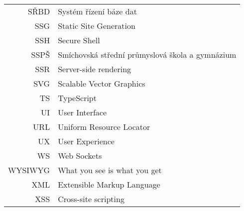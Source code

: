 \begin{longtable}{rl}
SŘBD & Systém řízení báze dat\\
SSG & Static Site Generation\\
SSH & Secure Shell\\
SSPŠ & Smíchovská střední průmyslová škola a gymnázium\\
SSR & Server-side rendering\\
SVG & Scalable Vector Graphics\\
TS & TypeScript\\
UI & User Interface\\
URL & Uniform Resource Locator\\
UX & User Experience\\
WS & Web Sockets\\
WYSIWYG & What you see is what you get\\
XML & Extensible Markup Language\\
XSS & Cross-site scripting
\end{longtable}